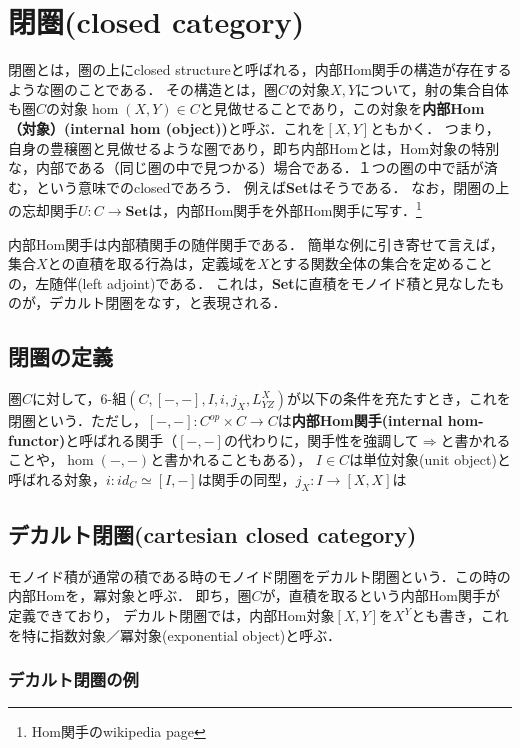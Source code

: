 \documentclass[uplatex, 12pt, dvipdfmx]{jsreport}
\begin{document}
\chapter{閉圏(closed category)}
閉圏とは，圏の上にclosed structureと呼ばれる，内部Hom関手の構造が存在するような圏のことである．
その構造とは，圏$C$の対象$X,Y$について，射の集合自体も圏$C$の対象$\hom(X,Y)\in C$と見做せることであり，この対象を\textbf{内部Hom（対象）(internal hom (object))}と呼ぶ．これを$[X,Y]$ともかく．
つまり，自身の豊穣圏と見做せるような圏であり，即ち内部Homとは，Hom対象の特別な，内部である（同じ圏の中で見つかる）場合である．１つの圏の中で話が済む，という意味でのclosedであろう．
例えば\textbf{Set}はそうである．
なお，閉圏の上の忘却関手$U:C\to\mathbf{Set}$は，内部Hom関手を外部Hom関手に写す．\footnote{Hom関手のwikipedia page}

内部Hom関手は内部積関手の随伴関手である．
簡単な例に引き寄せて言えば，集合$X$との直積を取る行為は，定義域を$X$とする関数全体の集合を定めることの，左随伴(left adjoint)である．
これは，\textbf{Set}に直積をモノイド積と見なしたものが，デカルト閉圏をなす，と表現される．

\section{閉圏の定義}

\begin{definition}\label{def-closed-category} \rm{}
    圏$C$に対して，6-組$(C,[-,-],I,i,j_X,L^X_{YZ})$が以下の条件を充たすとき，これを閉圏という．ただし，$[-,-]:C^{op}\times C\to C$は\textbf{内部Hom関手(internal hom-functor)}と呼ばれる関手（$[-,-]$の代わりに，関手性を強調して$\Rightarrow$と書かれることや，$\hom (-,-)$と書かれることもある），
    $I\in C$は単位対象(unit object)と呼ばれる対象，$i:id_C\simeq [I,-]$は関手の同型，$j_X:I\to [X,X]$は
\end{definition}

\section{デカルト閉圏(cartesian closed category)}

モノイド積が通常の積である時のモノイド閉圏をデカルト閉圏という．この時の内部Homを，冪対象と呼ぶ．
即ち，圏$C$が，直積を取るという内部Hom関手が定義できており，
デカルト閉圏では，内部Hom対象$[X,Y]$を$X^Y$とも書き，これを特に指数対象／冪対象(exponential object)と呼ぶ．
\subsection{デカルト閉圏の例}
\end{document}
